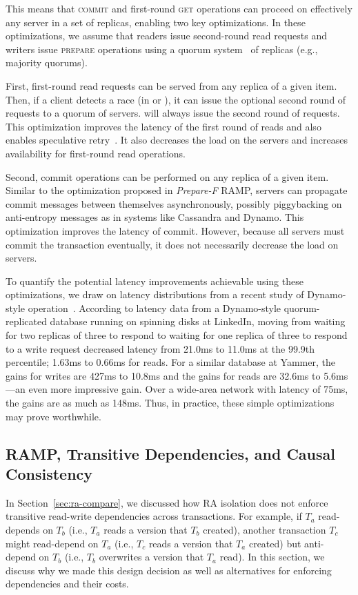 This means that \textsc{commit} and first-round \textsc{get} operations can proceed on effectively any server in a set of replicas, enabling two key optimizations. In these optimizations, we assume that readers issue second-round read requests and writers issue \textsc{prepare} operations using a quorum system~\cite{naor-quorums} of replicas (e.g., majority quorums).

First, first-round read requests can be served from any replica of a given item. Then, if a client detects a race (in \rapl or \rapb), it can issue the optional second round of requests to a quorum of servers. \raps will always issue the second round of requests. This optimization improves the latency of the first round of reads and also enables speculative retry~\cite{tailscale}. It also decreases the load on the servers and increases availability for first-round read operations.

Second, commit operations can be performed on any replica of a given item. Similar to the optimization proposed in \textit{Prepare-F} RAMP, servers can propagate commit messages between themselves asynchronously, possibly piggybacking on anti-entropy messages as in systems like Cassandra and Dynamo. This optimization improves the latency of commit. However, because all servers must commit the transaction eventually, it does not necessarily decrease the load on servers.

To quantify the potential latency improvements achievable using these optimizations, we draw on latency distributions from a recent study of Dynamo-style operation~\cite{pbs-vldbj2013}. According to latency data from a Dynamo-style quorum-replicated database running on spinning disks at LinkedIn, moving from waiting for two replicas of three to respond to waiting for one replica of three to respond to a write request decreased latency from 21.0ms to 11.0ms at the 99.9th percentile; 1.63ms to 0.66ms for reads. For a similar database at Yammer, the gains for writes are 427ms to 10.8ms and the gains for reads are 32.6ms  to 5.6ms---an even more impressive gain. Over a wide-area network with latency of 75ms, the gains are as much as 148ms. Thus, in practice, these simple optimizations may prove worthwhile.

\subsection{RAMP, Transitive Dependencies, and Causal Consistency}
\label{sec:causal}

In Section~\ref{sec:ra-compare}, we discussed how RA isolation does not enforce transitive read-write dependencies across transactions. For example, if $T_a$ read-depends on $T_b$ (i.e., $T_a$ reads a version that $T_b$ created), another transaction $T_c$ might read-depend on $T_a$ (i.e., $T_c$ reads a version that $T_a$ created) but anti-depend on $T_b$ (i.e., $T_b$ overwrites a version that $T_a$ read). In this section, we discuss why we made this design decision as well as alternatives for enforcing dependencies and their costs.

